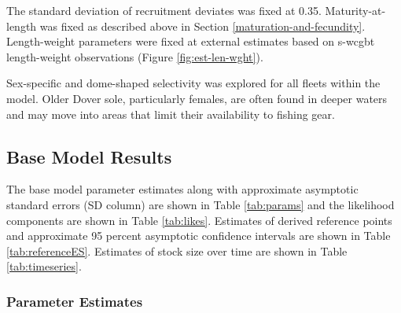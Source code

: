 \documentclass[11pt,
  english,
  a4paper,
]{article}
\begin{document}
\leavevmode\tagmcend\tagstructend\par


The standard deviation of recruitment deviates was fixed at 0.35. Maturity-at-length was fixed as described above in Section \ref{maturation-and-fecundity}. Length-weight parameters were fixed at external estimates based on \gls{s-wcgbt} length-weight observations (Figure \ref{fig:est-len-wght}).

\leavevmode\tagmcend\tagstructend\par


Sex-specific and dome-shaped selectivity was explored for all fleets within the model. Older Dover sole, particularly females, are often found in deeper waters and may move into areas that limit their availability to fishing gear.

\leavevmode\tagmcend\tagstructend\par


\hypertarget{base-model-results}{%
\subsection{Base Model Results}\label{base-model-results}}

\leavevmode\tagmcend\tagstructend


The base model parameter estimates along with approximate asymptotic standard errors (SD column) are shown in Table \ref{tab:params} and the likelihood components are shown in Table \ref{tab:likes}. Estimates of derived reference points and approximate 95 percent asymptotic confidence intervals are shown in Table \ref{tab:referenceES}. Estimates of stock size over time are shown in Table \ref{tab:timeseries}.

\leavevmode\tagmcend\tagstructend\par


\hypertarget{parameter-estimates}{%
\subsubsection{Parameter Estimates}\label{parameter-estimates}}
\end{document}
